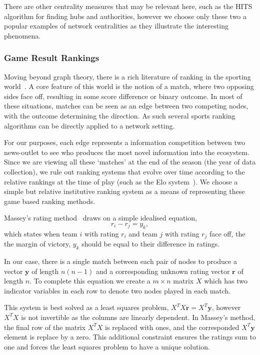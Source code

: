 There are other centrality measures that may be relevant here, such as the HITS algorithm for finding hubs and authorities, however we choose only these two a popular examples of network centralities as they illustrate the interesting phenomena.

\subsubsection{Game Result Rankings}

Moving beyond graph theory, there is a rich literature of ranking in the sporting world~\cite{langville_whos_2012}. A core feature of this world is the notion of a match, where two opposing sides face off, resulting in some score difference or binary outcome. In most of these situations, matches can be seen as an edge between two competing nodes, with the outcome determining the direction. As such several sports ranking algorithms can be directly applied to a network setting.

For our purposes, each edge represents a information competition between two news-outlet to see who produces the most novel information into the ecosystem. Since we are viewing all these `matches' at the end of the season (the year of data collection), we rule out ranking systems that evolve over time according to the relative rankings at the time of play (such as the Elo system~\cite{elo_rating_1978}). We choose a simple but relative institutive ranking system as a means of representing these game based ranking methods.


Massey's rating method~\cite{massey_statistical_1997,langville_whos_2012} draws on a simple idealised equation,
\begin{equation}
r_i- r_j=y_k,
\end{equation}
which states when team $i$ with rating $r_i$ and team $j$ with rating $r_j$ face off, the the margin of victory, $y_k$ should be equal to their difference in ratings.

In our case, there is a single match between each pair of nodes to produce a vector $\mathbf{y}$ of length  $n(n-1)$ and a corresponding unknown rating vector $\mathbf{r}$ of length $n$. To complete this equation we create a $m\times n$ matrix $X$ which has two indicator variables in each row to denote two nodes played in each match.

This system is best solved as a least squares problem, $X^TX\mathbf{r}=X^T\mathbf{y}$, however $X^TX$ is not invertible as the columns are linearly dependent. In Massey's method, the final row of the matrix $X^TX$ is replaced with ones, and the corresponded $X^T\mathbf{y}$ element is replace by a zero. This additional constraint ensures the ratings sum to one and forces the least squares problem to have a unique solution.

